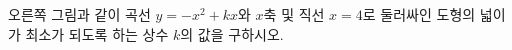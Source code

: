 \noindent\begin{minipage}[t]{0.58\linewidth}\vspace{0pt}\raggedright 오른쪽 그림과 같이 곡선 $y=-x^2+kx$와 $x$축 및 직선 $x=4$로 둘러싸인 도형의 넓이가 최소가 되도록 하는 상수 $k$의 값을 구하시오. \end{minipage}\hfill\begin{minipage}[t]{0.4\linewidth}\vspace{0pt}\centering \resizebox{\ifdim\width>\linewidth\linewidth\else\width\fi}{!}{}\end{minipage}\par
